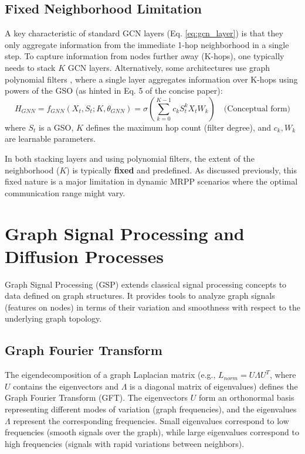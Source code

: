 \subsection{Fixed Neighborhood Limitation}
A key characteristic of standard GCN layers (Eq. \ref{eq:gcn_layer}) is that they only aggregate information from the immediate 1-hop neighborhood in a single step. To capture information from nodes further away (K-hops), one typically needs to stack $K$ GCN layers. Alternatively, some architectures use graph polynomial filters \cite{Defferrard2016ChebNet}, where a single layer aggregates information over K-hops using powers of the GSO (as hinted in Eq. 5 of the concise paper):
\begin{equation}
    H_{GNN} = f_{GNN}(X_t, S_t; K, \theta_{GNN}) = \sigma \left( \sum_{k=0}^{K-1} c_k S_t^k X_t W_k \right) \quad \text{(Conceptual form)}
\end{equation}
where $S_t$ is a GSO, $K$ defines the maximum hop count (filter degree), and $c_k, W_k$ are learnable parameters.

In both stacking layers and using polynomial filters, the extent of the neighborhood ($K$) is typically \textbf{fixed} and predefined. As discussed previously, this fixed nature is a major limitation in dynamic MRPP scenarios where the optimal communication range might vary.

\section{Graph Signal Processing and Diffusion Processes}
\label{sec:gsp_diffusion}

Graph Signal Processing (GSP) extends classical signal processing concepts to data defined on graph structures. It provides tools to analyze graph signals (features on nodes) in terms of their variation and smoothness with respect to the underlying graph topology.

\subsection{Graph Fourier Transform}
The eigendecomposition of a graph Laplacian matrix (e.g., $L_{norm} = U \Lambda U^T$, where $U$ contains the eigenvectors and $\Lambda$ is a diagonal matrix of eigenvalues) defines the Graph Fourier Transform (GFT). The eigenvectors $U$ form an orthonormal basis representing different modes of variation (graph frequencies), and the eigenvalues $\Lambda$ represent the corresponding frequencies. Small eigenvalues correspond to low frequencies (smooth signals over the graph), while large eigenvalues correspond to high frequencies (signals with rapid variations between neighbors).

